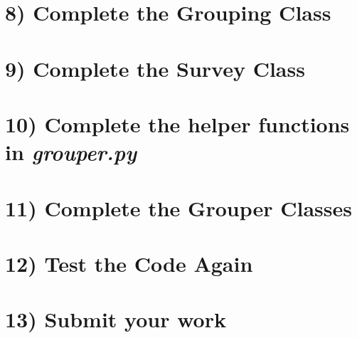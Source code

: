 \documentclass[12pt]{article}
\begin{document}
\section*{8) Complete the Grouping Class}

\section*{9) Complete the Survey Class}

\section*{10) Complete the helper functions in \textit{grouper.py}}

\section*{11) Complete the Grouper Classes}

\section*{12) Test the Code Again}

\section*{13) Submit your work}
\end{document}
